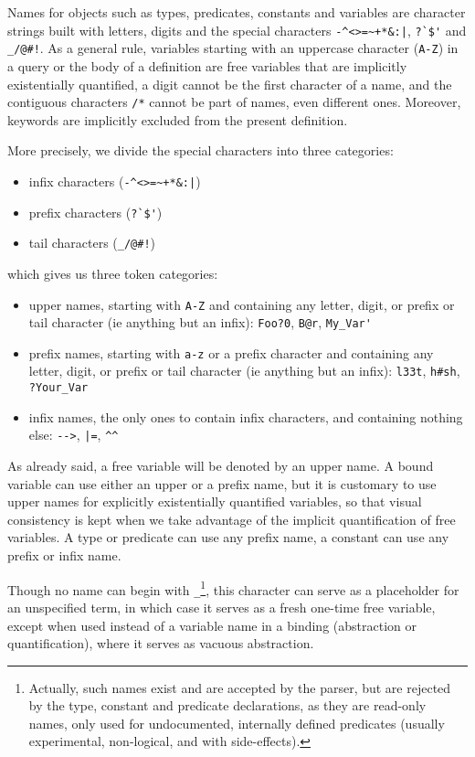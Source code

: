 \documentclass{article}
\begin{document}
Names for objects such as types, predicates, constants and variables are
character strings built with letters, digits and the special
characters \verb.-^<>=~+*&:|., \verb.?`$'. and \verb._/@#!..
As a general rule, variables starting with an uppercase character
(\verb.A-Z.) in a query or the body of a definition are free variables
that are implicitly existentially quantified, a digit cannot be the
first character of a name, and the contiguous characters \verb./*.
cannot be part of names, even different ones.
Moreover, keywords are implicitly excluded from the present
definition.

More precisely, we divide the special characters into three categories:
\begin{itemize}
  \item infix characters (\verb.-^<>=~+*&:|.)
  \item prefix characters (\verb.?`$'.)
  \item tail characters (\verb._/@#!.)
\end{itemize}
which gives us three token categories:
\begin{itemize}
  \item upper names, starting with \verb.A-Z. and containing any letter,
    digit, or prefix or tail character (ie anything but an infix):
    \verb.Foo?0., \verb.B@r., \verb.My_Var'.
  \item prefix names, starting with \verb.a-z. or a prefix character and
    containing any letter, digit, or prefix or tail character (ie
    anything but an infix): \verb.l33t., \verb.h#sh., \verb.?Your_Var.
  \item infix names, the only ones to contain infix characters, and
    containing nothing else: \verb.-->., \verb.|=., \verb.^^.
\end{itemize}
As already said, a free variable will be denoted by an upper name. A
bound variable can use either an upper or a prefix name, but it is
customary to use upper names for explicitly existentially quantified
variables, so that visual consistency is kept when we take advantage of
the implicit quantification of free variables. A type or predicate can
use any prefix name, a constant can use any prefix or infix name.

Though no name can begin with \verb._.\footnote{Actually, such names
exist and are accepted by the parser, but are rejected by the type,
constant and predicate declarations, as they are read-only names, only
used for undocumented, internally defined predicates (usually
experimental, non-logical, and with side-effects).}, this character can
serve as a placeholder for an unspecified term, in which case it serves
as a fresh one-time free variable, except when used instead of a
variable name in a binding (abstraction or quantification), where it
serves as vacuous abstraction.
\end{document}
